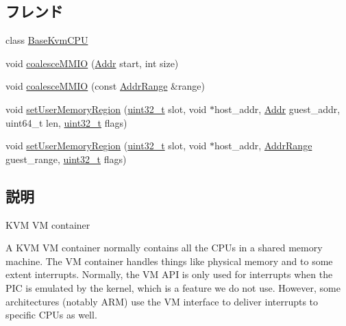 \subsection*{フレンド}
\begin{DoxyCompactItemize}
\item 
class \hyperlink{classKvmVM_a61d1fc6581a443ce7c1106a1b6922d40}{BaseKvmCPU}
\end{DoxyCompactItemize}
\label{_amgrpd41d8cd98f00b204e9800998ecf8427e}
 \begin{DoxyCompactItemize}
\item 
void \hyperlink{classKvmVM_a438f7ca24f2e320af449cd86d2a70990}{coalesceMMIO} (\hyperlink{base_2types_8hh_af1bb03d6a4ee096394a6749f0a169232}{Addr} start, int size)
\item 
void \hyperlink{classKvmVM_a4584fab486daeedc3dd9cb932ff55917}{coalesceMMIO} (const \hyperlink{classAddrRange}{AddrRange} \&range)
\item 
void \hyperlink{classKvmVM_a2d2ed492c91fc674db226f86fae39127}{setUserMemoryRegion} (\hyperlink{Type_8hh_a435d1572bf3f880d55459d9805097f62}{uint32\_\-t} slot, void $\ast$host\_\-addr, \hyperlink{base_2types_8hh_af1bb03d6a4ee096394a6749f0a169232}{Addr} guest\_\-addr, uint64\_\-t len, \hyperlink{Type_8hh_a435d1572bf3f880d55459d9805097f62}{uint32\_\-t} flags)
\item 
void \hyperlink{classKvmVM_a2ec4864d5df313708eff4cda418d8d01}{setUserMemoryRegion} (\hyperlink{Type_8hh_a435d1572bf3f880d55459d9805097f62}{uint32\_\-t} slot, void $\ast$host\_\-addr, \hyperlink{classAddrRange}{AddrRange} guest\_\-range, \hyperlink{Type_8hh_a435d1572bf3f880d55459d9805097f62}{uint32\_\-t} flags)
\end{DoxyCompactItemize}


\subsection{説明}
KVM VM container

A KVM VM container normally contains all the CPUs in a shared memory machine. The VM container handles things like physical memory and to some extent interrupts. Normally, the VM API is only used for interrupts when the PIC is emulated by the kernel, which is a feature we do not use. However, some architectures (notably ARM) use the VM interface to deliver interrupts to specific CPUs as well.

